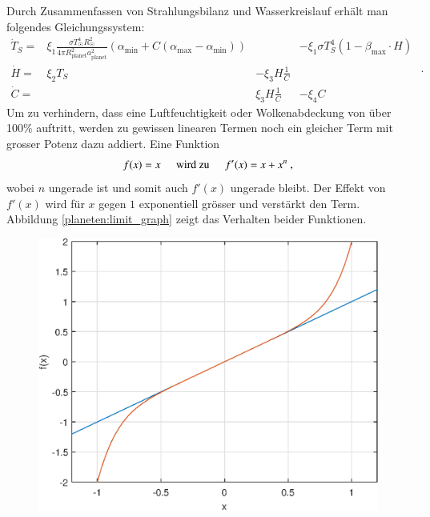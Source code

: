 \begin{refsection}
Durch Zusammenfassen von Strahlungsbilanz und Wasserkreislauf erhält man folgendes Gleichungssystem:
\begin{equation}
\begin{matrix}
\dot{T}_S = & \xi_1 \frac{\sigma T_{\astrosun}^4 R_{\astrosun}^2}{4 \pi R_{\text{planet}}^2 a_{\text{planet}}^2} (\alpha_{\text{min}} + C(\alpha_{\text{max}} - \alpha_{\text{min}})) && - \xi_1 \sigma T_{S}^4  (1 - \beta_{\text{max}} \cdot H)\\
\dot{H}   = & \xi_2 T_S              & - \xi_3 H \frac{1}{C}          & \\
\dot{C}   = &                        &   \xi_3 H \frac{1}{C}          & - \xi_4 C
\end{matrix} \text{ .}
\end{equation}
Um zu verhindern, dass eine Luftfeuchtigkeit oder Wolkenabdeckung von über 100\% auftritt, werden zu gewissen linearen Termen noch ein gleicher Term mit grosser Potenz dazu addiert. Eine Funktion
\begin{equation}
f(x) = x \hspace{0.5cm}\text{wird zu}\hspace{0.5cm} f'(x) = x + x^n \text{ ,}
\end{equation}
wobei $n$ ungerade ist und somit auch $f'(x)$ ungerade bleibt. Der Effekt von $f'(x)$ wird für $x$ gegen $1$ exponentiell grösser und verstärkt den Term. Abbildung \ref{planeten:limit_graph} zeigt das Verhalten beider Funktionen.
\begin{figure}[!h]
	\center
	\includegraphics[height=0.45\textheight]{planeten/Matlab/figures/limiter.eps}

\end{figure}
\end{refsection}
